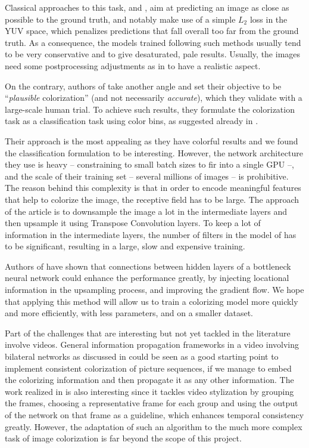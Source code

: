 \documentclass[10pt,twocolumn,letterpaper]{article}
\begin{document}
Classical approaches to this task, \eg \cite{cheng2015deep} and \cite{dahl2016tinyclouds}, aim at predicting an image as close as possible to the ground truth, and notably make use of a simple $L_2$ loss in the YUV space, which penalizes predictions that fall overall too far from the ground truth. As a consequence, the models trained following such methods usually tend to be very conservative and to give desaturated, pale results. Usually, the images need some postprocessing adjustments as in \cite{deshpande2015learning} to have a realistic aspect.

On the contrary, authors of \cite{zhang2016colorful} take another angle and set their objective to be ``\textit{plausible} colorization'' (and not necessarily \textit{accurate}), which they validate with a large-scale human trial. To achieve such results, they formulate the colorization task as a classification task using color bins, as suggested already in \cite{charpiat2008automatic}.

Their approach is the most appealing as they have colorful results and we found the classification formulation to be interesting. However, the network architecture they use is heavy -- constraining to small batch sizes to fir into a single GPU --, and the scale of their training set -- several millions of images -- is prohibitive. The reason behind this complexity is that in order to encode meaningful features that help to colorize the image, the receptive field has to be large. The approach of the article is to downsample the image a lot in the intermediate layers and then upsample it using Transpose Convolution layers. To keep a lot of information in the intermediate layers, the number of filters in the model of \cite{zhang2016colorful} has to be significant, resulting in a large, slow and expensive training.

Authors of \cite{ronneberger2015unet} have shown that connections between hidden layers of a bottleneck neural network could enhance the performance greatly, by injecting locational information in the upsampling process, and improving the gradient flow.
We hope that applying this method will allow us to train a colorizing model more quickly and more efficiently, with less parameters, and on a smaller dataset.

Part of the challenges that are interesting but not yet tackled in the literature involve videos. General information propagation frameworks in a video involving bilateral networks as discussed in \cite{jampani2017video} could be seen as a good starting point to implement consistent colorization of picture sequences, if we manage to embed the colorizing information and then propagate it as any other information. The work realized in \cite{zhu2017video} is also interesting since it tackles video stylization by grouping the frames, choosing a representative frame for each group and using the output of the network on that frame as a guideline, which enhances temporal consistency greatly. However, the adaptation of such an algorithm to the much more complex task of image colorization is far beyond the scope of this project.
\end{document}
